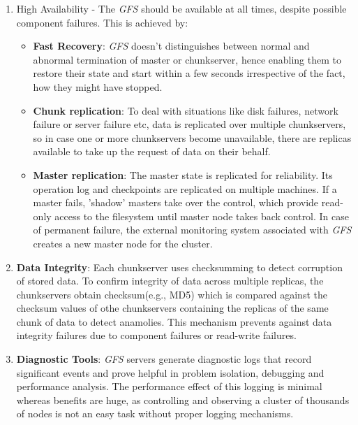 \documentclass[12pt, a4paper]{article}
\begin{document}
\begin{enumerate}
        \item High Availability - The \textit{GFS}\cite{Ghemawat:2003:GFS:945445.945450} should be available at all times, despite possible component failures. This is achieved by:
        \begin{itemize}
                \item \textbf{Fast Recovery}: \textit{GFS}\cite{Ghemawat:2003:GFS:945445.945450} doesn't distinguishes between normal and abnormal termination of master or chunkserver, hence enabling them to restore their state and start within a few seconds irrespective of the fact, how they might have stopped.

                \item \textbf{Chunk replication}: To deal with situations like disk failures, network failure or server failure etc, data is replicated over multiple chunkservers, so in case one or more chunkservers become unavailable, there are replicas available to take up the request of data on their behalf.

                \item \textbf{Master replication}: The master state is replicated for reliability. Its operation log and checkpoints are replicated on multiple machines. If a master fails, 'shadow' masters take over the control, which provide read-only access to the filesystem until master node takes back control. In case of permanent failure, the external monitoring system associated with \textit{GFS}\cite{Ghemawat:2003:GFS:945445.945450} creates a new master node for the cluster.
        \end{itemize}

        \item \textbf{Data Integrity}: Each chunkserver uses checksumming to detect corruption of stored data. To confirm integrity of data across multiple replicas, the chunkservers obtain checksum(e.g., MD5) which is compared against the checksum values of othe chunkservers containing the replicas of the same chunk of data to detect anamolies. This mechanism prevents against data integrity failures due to component failures or read-write failures.

        \item \textbf{Diagnostic Tools}: \textit{GFS}\cite{Ghemawat:2003:GFS:945445.945450} servers generate diagnostic logs that record significant events and prove helpful in problem isolation, debugging and performance analysis. The performance effect of this logging is minimal whereas benefits are huge, as controlling and observing a cluster of thousands of nodes is not an easy task without proper logging mechanisms.
\end{enumerate}

 

\end{document}

